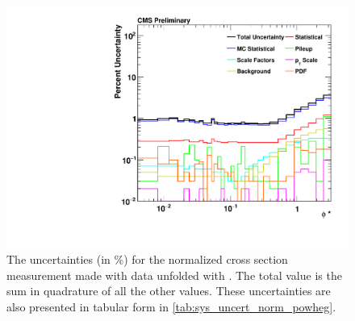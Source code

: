 \begin{figure}[!p]
    \centering
    \includegraphics[width=\textwidth]{figures/data_uncertainty_normalized_powheg_unfolded.pdf}
    \caption[
        The uncertainty for the normalized cross section measurement made with
        data unfolded with \PPsixZtwo.
    ]{
        The uncertainties (in \%) for the normalized cross section measurement
        made with data unfolded with \PPsixZtwo. The total value is the sum in
        quadrature of all the other values. These uncertainties are also
        presented in tabular form in \cref{tab:sys_uncert_norm_powheg}.
    }
    \label{fig:sys_uncert_norm_powheg}
\end{figure}
